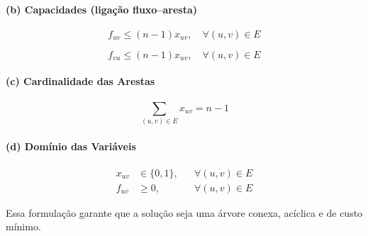 \paragraph{(b) Capacidades (ligação fluxo–aresta)}

\begin{equation}
    f_{uv} \le (n-1)x_{uv}, \quad \forall (u,v)\in E
\end{equation}

\begin{equation}
    f_{vu} \le (n-1)x_{uv}, \quad \forall (u,v)\in E
\end{equation}

\paragraph{(c) Cardinalidade das Arestas}

\begin{equation}
    \sum_{(u,v)\in E} x_{uv} = n-1
\end{equation}

\paragraph{(d) Domínio das Variáveis}

\begin{align}
    x_{uv} &\in \{0,1\}, && \forall (u,v)\in E \\
    f_{uv} &\ge 0,       && \forall (u,v)\in E
\end{align}

\noindent
Essa formulação garante que a solução seja uma árvore conexa, acíclica e de custo mínimo.

